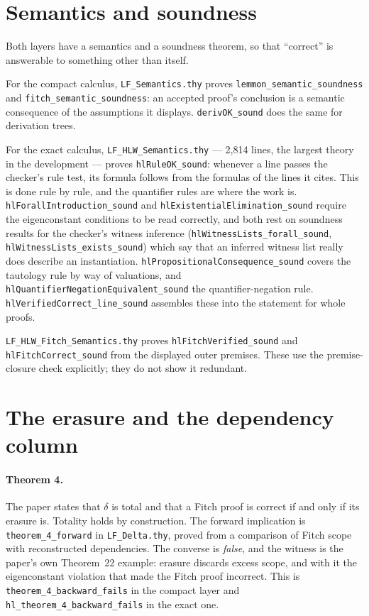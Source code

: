 \documentclass[11pt]{article}
\theoremstyle{plain}
\newcommand{\ubrk}{\_\discretionary{}{}{}}
\newcommand{\isa}[1]{\textup{\texttt{\small #1}}}
\newcommand{\thy}[1]{\textup{\texttt{\small #1}}}
\begin{document}
\section{Semantics and soundness}\label{sec:semantics}

Both layers have a semantics and a soundness theorem, so that ``correct'' is
answerable to something other than itself.

For the compact calculus, \thy{LF\ubrk{}Semantics.thy} proves
\isa{lemmon\ubrk{}semantic\ubrk{}soundness} and \isa{fitch\ubrk{}semantic\ubrk{}soundness}: an
accepted proof's conclusion is a semantic consequence of the assumptions it
displays. \isa{derivOK\ubrk{}sound} does the same for derivation trees.

For the exact calculus, \thy{LF\ubrk{}HLW\ubrk{}Semantics.thy} --- 2{,}814 lines, the
largest theory in the development --- proves \isa{hlRuleOK\ubrk{}sound}: whenever a
line passes the checker's rule test, its formula follows from the formulas of
the lines it cites. This is done rule by rule, and the quantifier rules are
where the work is. \isa{hlForallIntroduction\ubrk{}sound} and
\isa{hlExistentialElimination\ubrk{}sound} require the eigenconstant conditions to be
read correctly, and both rest on soundness results for the checker's witness
inference (\isa{hlWitnessLists\ubrk{}forall\ubrk{}sound},
\isa{hlWitnessLists\ubrk{}exists\ubrk{}sound}) which say that an inferred witness list
really does describe an instantiation. \isa{hlPropositionalConsequence\ubrk{}sound}
covers the tautology rule by way of valuations, and
\isa{hlQuantifierNegationEquivalent\ubrk{}sound} the quantifier-negation rule.
\isa{hlVerifiedCorrect\ubrk{}line\ubrk{}sound} assembles these into the statement for
whole proofs.

\thy{LF\ubrk{}HLW\ubrk{}Fitch\ubrk{}Semantics.thy} proves \isa{hlFitchVerified\ubrk{}sound} and
\isa{hlFitchCorrect\ubrk{}sound} from the displayed outer premises. These use the
premise-closure check explicitly; they do not show it redundant.

\section{The erasure and the dependency column}\label{sec:erasure}

\paragraph{Theorem 4.} The paper states that $\delta$ is total and that a Fitch
proof is correct if and only if its erasure is. Totality holds by construction.
The forward implication is \isa{theorem\ubrk{}4\ubrk{}forward} in \thy{LF\ubrk{}Delta.thy},
proved from a comparison of Fitch scope with reconstructed dependencies. The
converse is \emph{false}, and the witness is the paper's own Theorem~22
example: erasure discards excess scope, and with it the eigenconstant violation
that made the Fitch proof incorrect. This is
\isa{theorem\ubrk{}4\ubrk{}backward\ubrk{}fails} in the compact layer and
\isa{hl\ubrk{}theorem\ubrk{}4\ubrk{}backward\ubrk{}fails} in the exact one.
\end{document}
